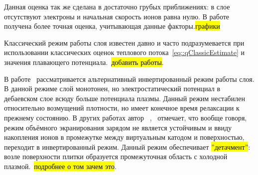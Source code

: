 Данная оценка так же сделана в достаточно грубых приближениях: в слое
отсутствуют электроны и начальная скорость ионов равна нулю. В
работе~\cite{chabert2014size} получена более точная оценка, учитывающая данные
факторы.\hl{графики}

Классический режим работы слоя известен давно и часто подразумевается при
использовании классических оценок теплового потока~\eqref{eq::qClassicEstimate}
и значения плавающего потенциала.~\hl{добавить работы}.

В работе~\cite{campanell2018alternative} рассматривается альтернативный
инвертированный режим работы слоя. В данной режиме слой монотонен, но
электростатический потенциал в дебаевском слое всюду больше потенциала плазмы.
Данный режим нестабилен относительно возмущений плотности, но имеет конечное
время релаксации к прежнему состоянию. В других работах автор
~\cite{campanell2016strongly},~\cite{campanell2020possible} отмечает, что
вообще говоря, режим объёмного экранирования зарядом не является устойчивым и
ввиду накопления ионов в промежутке между виртуальным катодом и поверхностью,
переходит в инвертированный режим. Данный режим обеспечивает \hl{''детачмент''}:
возле поверхности плитки образуется промежуточная область с холодной
плазмой.~\hl{подробнее о том зачем это}.

\pagebreak

